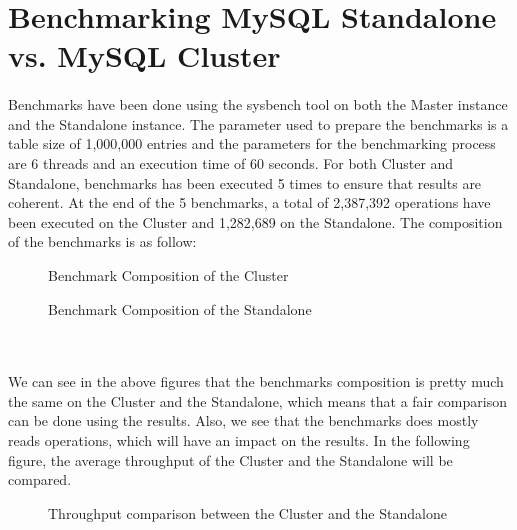 \pagebreak
\section{Benchmarking MySQL Standalone vs. MySQL Cluster} \label{T3}

\paragraph{} Benchmarks have been done using the sysbench tool on both the Master instance and the Standalone instance. The parameter used to prepare the benchmarks is a table size of 1,000,000 entries and the parameters for the benchmarking process are 6 threads and an execution time of 60 seconds. For both Cluster and Standalone, benchmarks has been executed 5 times to ensure that results are coherent. At the end of the 5 benchmarks, a total of 2,387,392 operations have been executed on the Cluster and 1,282,689 on the Standalone. The composition of the benchmarks is as follow:

\begin{figure}[htbp]
  \centering
  \begin{minipage}[b]{0.48\textwidth}
    
    \caption{Benchmark Composition of the Cluster}
  \end{minipage}
  \hfill
  \begin{minipage}[b]{0.48\textwidth}
    
    \caption{Benchmark Composition of the Standalone}
  \end{minipage}
\end{figure}\\

\paragraph{} We can see in the above figures that the benchmarks composition is pretty much the same on the Cluster and the Standalone, which means that a fair comparison can be done using the results. Also, we see that the benchmarks does mostly reads operations, which will have an impact on the results. In the following figure, the average throughput of the Cluster and the Standalone will be compared.\\

\begin{figure}[htbp]
  \centering
  
  \caption{Throughput comparison between the Cluster and the Standalone}
\end{figure}\\

